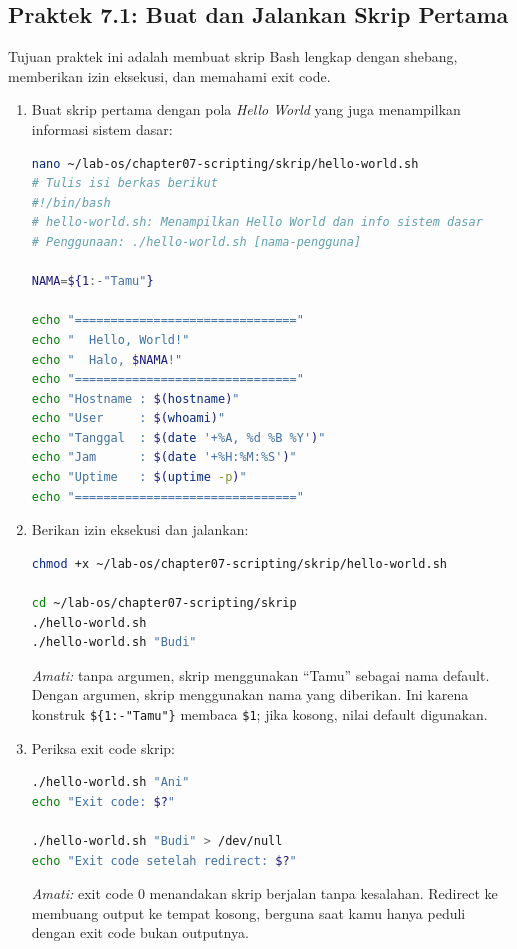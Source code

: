 \subsection*{Praktek 7.1: Buat dan Jalankan Skrip Pertama}

Tujuan praktek ini adalah membuat skrip Bash lengkap dengan shebang,
memberikan izin eksekusi, dan memahami exit code.

\begin{enumerate}
    \item Buat skrip pertama dengan pola \textit{Hello World} yang juga menampilkan informasi sistem dasar:
\begin{lstlisting}[language=bash, caption={Membuat skrip hello-world.sh}]
nano ~/lab-os/chapter07-scripting/skrip/hello-world.sh
# Tulis isi berkas berikut
#!/bin/bash
# hello-world.sh: Menampilkan Hello World dan info sistem dasar
# Penggunaan: ./hello-world.sh [nama-pengguna]

NAMA=${1:-"Tamu"}

echo "==============================="
echo "  Hello, World!"
echo "  Halo, $NAMA!"
echo "==============================="
echo "Hostname : $(hostname)"
echo "User     : $(whoami)"
echo "Tanggal  : $(date '+%A, %d %B %Y')"
echo "Jam      : $(date '+%H:%M:%S')"
echo "Uptime   : $(uptime -p)"
echo "==============================="
\end{lstlisting}

    \item Berikan izin eksekusi dan jalankan:
\begin{lstlisting}[language=bash, caption={Memberikan izin dan menjalankan skrip}]
chmod +x ~/lab-os/chapter07-scripting/skrip/hello-world.sh

cd ~/lab-os/chapter07-scripting/skrip
./hello-world.sh
./hello-world.sh "Budi"
\end{lstlisting}
    \textit{Amati:} tanpa argumen, skrip menggunakan ``Tamu'' sebagai
    nama default. Dengan argumen, skrip menggunakan nama yang diberikan.
    Ini karena konstruk \texttt{\$\{1:-"Tamu"\}} membaca \texttt{\$1};
    jika kosong, nilai default digunakan.

    \item Periksa exit code skrip:
\begin{lstlisting}[language=bash, caption={Memeriksa exit code}]
./hello-world.sh "Ani"
echo "Exit code: $?"

./hello-world.sh "Budi" > /dev/null
echo "Exit code setelah redirect: $?"
\end{lstlisting}
    \textit{Amati:} exit code 0 menandakan skrip berjalan tanpa kesalahan.
    Redirect ke  membuang output ke tempat kosong, berguna
    saat kamu hanya peduli dengan exit code bukan outputnya.


\end{enumerate}
